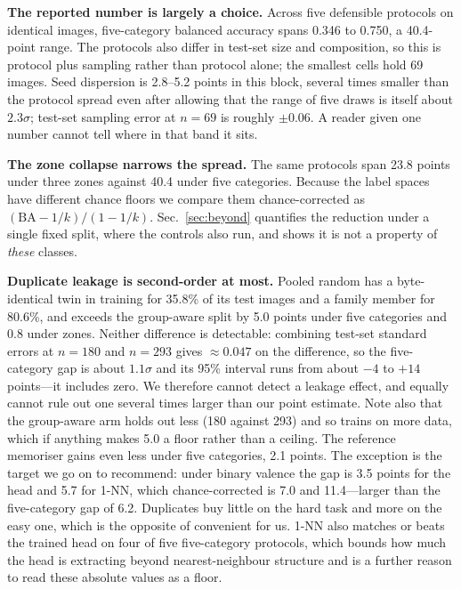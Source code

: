 \documentclass[conference,10pt]{IEEEtran}
\begin{document}
\textbf{The reported number is largely a choice.} Across five defensible
protocols on identical images, five-category balanced accuracy spans 0.346 to
0.750, a 40.4-point range. The protocols also differ in test-set size and
composition, so this is protocol plus sampling rather than protocol alone; the
smallest cells hold 69 images.
Seed dispersion is 2.8--5.2 points in this block,
several times smaller than the protocol spread even after allowing that the
range of five draws is itself about $2.3\sigma$; test-set sampling error at
$n=69$ is roughly $\pm0.06$. A reader given one number cannot tell where in
that band it sits.

\textbf{The zone collapse narrows the spread.} The same protocols span 23.8
points under three zones against 40.4 under five categories. Because the label
spaces have different chance floors we compare them chance-corrected as
$(\text{BA}-1/k)/(1-1/k)$. Sec.~\ref{sec:beyond} quantifies the reduction under
a single fixed split, where the controls also run, and shows it is not a
property of \emph{these} classes.

\textbf{Duplicate leakage is second-order at most.} Pooled random has a
byte-identical twin in training for 35.8\% of its test images and a family
member for 80.6\%, and exceeds the group-aware split by 5.0 points under five
categories and 0.8 under zones. Neither difference is detectable: combining
test-set standard errors at $n=180$ and $n=293$ gives ${\approx}0.047$ on the
difference, so the five-category gap is about $1.1\sigma$ and its 95\%
interval runs from about $-4$ to $+14$ points---it includes zero. We therefore
cannot detect a leakage effect, and equally cannot rule out one several times
larger than our point estimate. Note also that the group-aware arm holds out
less (180 against 293) and so trains on more data, which if anything makes 5.0
a floor rather than a ceiling. The reference memoriser gains
even less under five categories, 2.1 points. The exception is the target we go
on to recommend: under binary valence the gap is 3.5 points for the head and 5.7
for 1-NN, which chance-corrected is 7.0 and 11.4---larger than the five-category
gap of 6.2. Duplicates buy little on the hard task and more on the easy one,
which is the opposite of convenient for us. 1-NN also matches or beats the trained head on four of five five-category
protocols, which bounds how much the head is extracting beyond nearest-neighbour
structure and is a further reason to read these absolute values as a floor.
\end{document}

